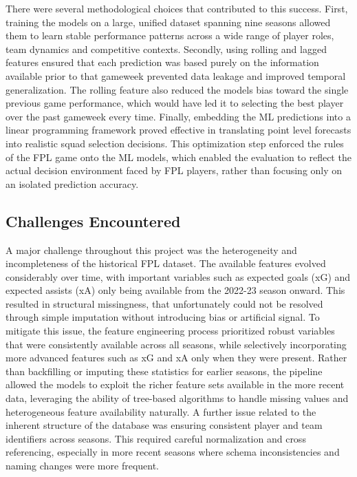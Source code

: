 \documentclass[11pt,a4paper]{article}
\begin{document}
There were several methodological choices that contributed to this success. First, training the models on a large, unified dataset spanning nine seasons allowed them to learn stable performance patterns across a wide range of player roles, team dynamics and competitive contexts. Secondly, using rolling and lagged features ensured that each prediction was based purely on the information available prior to that gameweek prevented data leakage and improved temporal generalization. The rolling feature also reduced the models bias toward the single previous game performance, which would have led it to selecting the best player over the past gameweek every time. Finally, embedding the ML predictions into a linear programming framework proved effective in translating point level forecasts into realistic squad selection decisions. This optimization step enforced the rules of the FPL game onto the ML models, which enabled the evaluation to reflect the actual decision environment faced by FPL players, rather than focusing only on an isolated prediction accuracy. 

\subsection{Challenges Encountered}
A major challenge throughout this project was the heterogeneity and incompleteness of the historical FPL dataset. The available features evolved considerably over time, with important variables such as expected goals (xG) and expected assists (xA) only being available from the 2022-23 season onward. This resulted in structural missingness, that unfortunately could not be resolved through simple imputation without introducing bias or artificial signal. To mitigate this issue, the feature engineering process prioritized robust variables that were consistently available across all seasons, while selectively incorporating more advanced features such as xG and xA only when they were present. Rather than backfilling or imputing these statistics for earlier seasons, the pipeline allowed the models to exploit the richer feature sets available in the more recent data, leveraging the ability of tree-based algorithms to handle missing values and heterogeneous feature availability naturally. A further issue related to the inherent structure of the database was ensuring consistent player and team identifiers across seasons. This required careful normalization and cross referencing, especially in more recent seasons where schema inconsistencies and naming changes were more frequent. 
\end{document}
